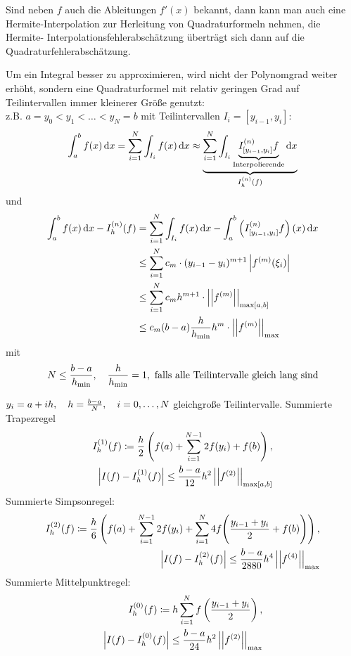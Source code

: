 \documentclass[../Skript.tex]{subfiles}
\begin{document}
\begin{remark}
    Sind neben $f$ auch die Ableitungen $f'(x)$ bekannt, dann kann man 
    auch eine 
    Hermite-Interpolation zur Herleitung von Quadraturformeln nehmen, 
    die Hermite-
    Interpolationsfehlerabschätzung überträgt sich dann auf die 
    Quadraturfehlerabschätzung.
\end{remark}
Um ein Integral besser zu approximieren, wird \typicherweise nicht der 
Polynomgrad 
weiter erhöht, sondern eine Quadraturformel mit relativ geringen Grad 
auf 
Teilintervallen immer kleinerer Größe genutzt:\\
z.B.    $a = y_0 < y_1 < \dots < y_N = b$ mit Teilintervallen $I_i = 
[y_{i-1}, 
    y_i]$:\[
        \int_a^b f(x)\mathop{}\!\mathrm{d} x = \sum_{i=1}^N \int_{I_i}f(x)\mathop{}\!\mathrm{d} x\approx
        \underset{I_h^{(n)}(f)}{\underbrace{\displaystyle\sum_{i=1}^N \int_{I_i} 
        \underset{\text{Interpolierende}}
        {\underbrace{I^{(n)}_{[y_{i-1}, y_i]}f}}\mathop{}\!\mathrm{d} x}}
    \] 
    und \begin{align*}
                \int_a^b f(x)\mathop{}\!\mathrm{d} x - I_h^{(n)}(f) &= \displaystyle\sum_{i=1}^N 
                \int_{I_i}f(x)\mathop{}\!\mathrm{d} x - \int_a^b\left(I_{[y_{i-1}, 
                y_i]}^{(n)}f\right)(x)\mathop{}\!\mathrm{d} x\\
                &\leq \displaystyle\sum_{i=1}^N c_m\cdot(y_{i-1}-
                y_i)^{m+1}\left\vert f^{(m)}
                (\xi_i) \right\vert\\
                &\leq \displaystyle\sum_{i=1}^N c_mh^{m+1}\cdot 
                \left\vert\left\vert f^{(m)}\right\vert\right\vert_{\max[a,b]}\\
                &\leq c_m(b-a)\frac{h}
                {h_{\min}}h^{m}\cdot\left\vert\left\vert f^{(m)}\right\vert\right\vert_{\max}
    \end{align*}
    mit \[
        N\leq \frac{b-a}{h_{\min}} , \hspace{1em} \frac{h}{h_{\min}}= 1, 
        \text{ 
        falls 
        alle Teilintervalle gleich lang sind}
    \]
\begin{example}
    $y_i = a+ih, \largespace h=\frac{b-a}{N}, \largespace \igb i 0 N$ 
    gleichgroße 
    Teilintervalle. 
    Summierte Trapezregel \begin{align*}
        I^{(1)}_h(f)\coloneqq \frac{h}{2}\left(f(a)+ \displaystyle\sum_{i=1}^{N-
        1}2f(y_i)+f(b)\right), \\
        \left\vert I(f)-I^{(1)}_h(f) \right\vert\leq \frac{b-a}{12}h^2
        \left\vert \left\vert f^{(2)} \right\vert \right\vert_{\max[a,b]}
    \end{align*}
    Summierte Simpsonregel: \begin{align*}
        I^{(2)}_h(f)\coloneqq \frac{h}{6}\left(f(a)+ \displaystyle\sum_{i=1}^{N-
        1}2f(y_i)+\displaystyle\sum_{i=1}^{N}4f\middle(\frac{y_{i-1}+y_i}
        {2}+f(b)\middle)
        \right), \\
        \left\vert I(f)-I^{(2)}_h(f) \right\vert\leq \frac{b-a}{2880}h^4
        \left\vert \left\vert f^{(4)} \right\vert \right\vert_{\max}
    \end{align*}
    Summierte Mittelpunktregel: \begin{align*}
        I^{(0)}_h(f)\coloneqq h\displaystyle\sum_{i=1}^{N}f\left(\frac{y_{i-1}+y_i}
        {2}\right), \\
        \left\vert I(f)-I^{(0)}_h(f) \right\vert\leq \frac{b-a}{24}h^2
        \left\vert \left\vert f^{(2)} \right\vert \right\vert_{\max}
    \end{align*}
\end{example}
\end{document}

